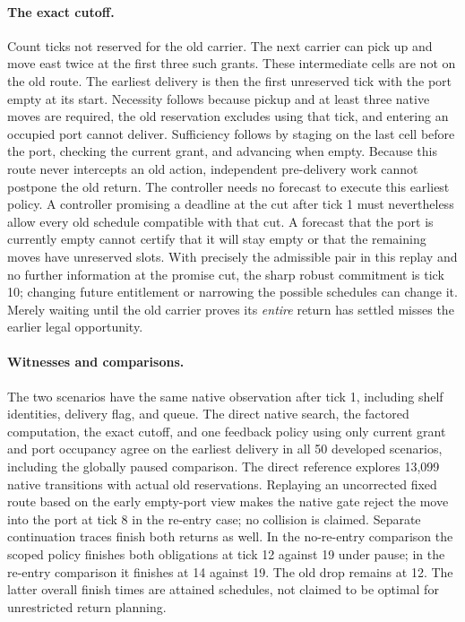 \documentclass[11pt]{article}
\begin{document}
\paragraph{The exact cutoff.}
Count ticks not reserved for the old carrier. The next carrier can pick up and move east twice at the first three such grants. These intermediate cells are not on the old route. The earliest delivery is then the first unreserved tick with the port empty at its start. Necessity follows because pickup and at least three native moves are required, the old reservation excludes using that tick, and entering an occupied port cannot deliver. Sufficiency follows by staging on the last cell before the port, checking the current grant, and advancing when empty. Because this route never intercepts an old action, independent pre-delivery work cannot postpone the old return. The controller needs no forecast to execute this earliest policy. A controller promising a deadline at the cut after tick 1 must nevertheless allow every old schedule compatible with that cut. A forecast that the port is currently empty cannot certify that it will stay empty or that the remaining moves have unreserved slots. With precisely the admissible pair in this replay and no further information at the promise cut, the sharp robust commitment is tick 10; changing future entitlement or narrowing the possible schedules can change it. Merely waiting until the old carrier proves its \emph{entire} return has settled misses the earlier legal opportunity.

\paragraph{Witnesses and comparisons.}
The two scenarios have the same native observation after tick 1, including shelf identities, delivery flag, and queue. The direct native search, the factored computation, the exact cutoff, and one feedback policy using only current grant and port occupancy agree on the earliest delivery in all 50 developed scenarios, including the globally paused comparison. The direct reference explores 13,099 native transitions with actual old reservations. Replaying an uncorrected fixed route based on the early empty-port view makes the native gate reject the move into the port at tick 8 in the re-entry case; no collision is claimed. Separate continuation traces finish both returns as well. In the no-re-entry comparison the scoped policy finishes both obligations at tick 12 against 19 under pause; in the re-entry comparison it finishes at 14 against 19. The old drop remains at 12. The latter overall finish times are attained schedules, not claimed to be optimal for unrestricted return planning.
\end{document}

